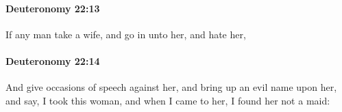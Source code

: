 		\paragraph{Deuteronomy 22:13} %
			\label{DEUTERONOMY-22-13}

			If any man take a wife, and go in unto her, and hate her,


		\paragraph{Deuteronomy 22:14} %
			\label{DEUTERONOMY-22-14}

			And give occasions of speech against her, and bring up an evil name upon her, and say, I took this woman, and when I came to her, I found her not a maid:


